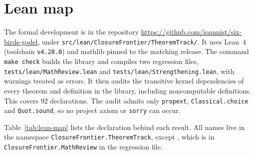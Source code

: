 \section{Lean map}\label{app:lean-map}

The formal development is in the repository \url{https://github.com/ioannist/six-birds-godel}, under \texttt{src/lean/ClosureFrontier/TheoremTrack/}. It uses Lean~4 (toolchain \texttt{v4.28.0}) and mathlib pinned to the matching release. The command \texttt{make check} builds the library and compiles two regression files, \texttt{tests/lean/MathReview.lean} and \texttt{tests/lean/Strengthening.lean}, with warnings treated as errors. It then audits the transitive kernel dependencies of every theorem and definition in the library, including noncomputable definitions. This covers $92$ declarations. The audit admits only \texttt{propext}, \texttt{Classical.choice} and \texttt{Quot.sound}, so no project axiom or \texttt{sorry} can occur.

Table~\ref{tab:lean-map} lists the declaration behind each result. All names live in the namespace \texttt{ClosureFrontier.TheoremTrack}, except , which is in \texttt{ClosureFrontier.MathReview} in the regression file.

